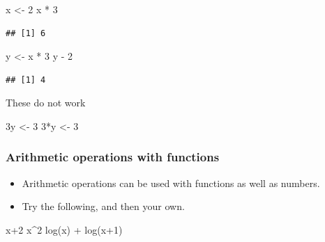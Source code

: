 \documentclass[
]{book}
\newenvironment{Shaded}{\begin{snugshade}}{\end{snugshade}}
\newcommand{\DecValTok}[1]{\textcolor[rgb]{0.00,0.00,0.81}{#1}}
\newcommand{\FunctionTok}[1]{\textcolor[rgb]{0.00,0.00,0.00}{#1}}
\newcommand{\NormalTok}[1]{#1}
\newcommand{\OtherTok}[1]{\textcolor[rgb]{0.56,0.35,0.01}{#1}}
\newcommand{\SpecialCharTok}[1]{\textcolor[rgb]{0.00,0.00,0.00}{#1}}
\begin{document}
\begin{Shaded}
\begin{Highlighting}[]
\NormalTok{x }\OtherTok{\textless{}{-}} \DecValTok{2}
\NormalTok{x }\SpecialCharTok{*} \DecValTok{3}
\end{Highlighting}
\end{Shaded}

\begin{verbatim}
## [1] 6
\end{verbatim}

\begin{Shaded}
\begin{Highlighting}[]
\NormalTok{y }\OtherTok{\textless{}{-}}\NormalTok{ x }\SpecialCharTok{*} \DecValTok{3}
\NormalTok{y }\SpecialCharTok{{-}} \DecValTok{2}
\end{Highlighting}
\end{Shaded}

\begin{verbatim}
## [1] 4
\end{verbatim}

These do not work

\begin{Shaded}
\begin{Highlighting}[]
\NormalTok{3y }\OtherTok{\textless{}{-}} \DecValTok{3}
\DecValTok{3}\SpecialCharTok{*}\NormalTok{y }\OtherTok{\textless{}{-}} \DecValTok{3}
\end{Highlighting}
\end{Shaded}

\hypertarget{arithmetic-operations-with-functions}{%
\subsubsection{Arithmetic operations with functions}\label{arithmetic-operations-with-functions}}

\begin{itemize}
\item
  Arithmetic operations can be used with functions as well as numbers.
\item
  Try the following, and then your own.
\end{itemize}

\begin{Shaded}
\begin{Highlighting}[]
\NormalTok{x}\SpecialCharTok{+}\DecValTok{2}
\NormalTok{x}\SpecialCharTok{\^{}}\DecValTok{2}
\FunctionTok{log}\NormalTok{(x) }\SpecialCharTok{+} \FunctionTok{log}\NormalTok{(x}\SpecialCharTok{+}\DecValTok{1}\NormalTok{)}
\end{Highlighting}
\end{Shaded}
\end{document}
